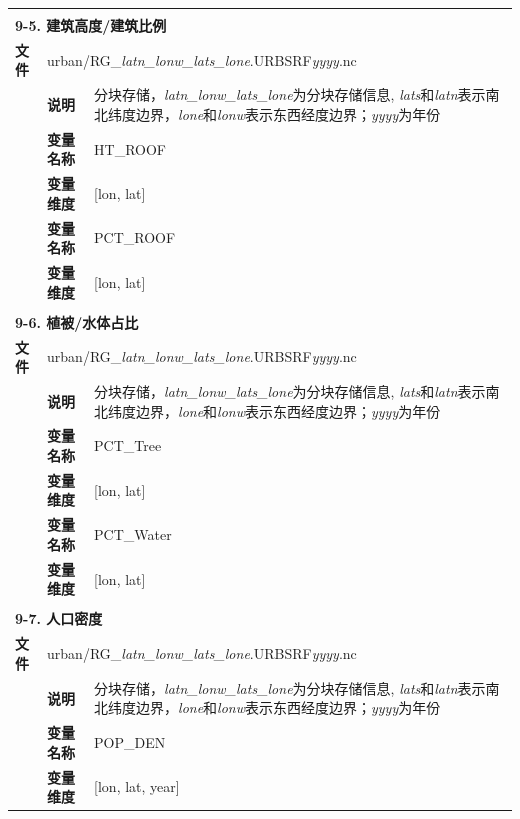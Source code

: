 \documentclass[a4paper,12pt,twoside]{article}
\begin{document}
{\begin{longtable}{llp{}}
\midrule
\vspace{2\baselineskip}\\
\multicolumn{3}{l}{\textbf{9-5. 建筑高度/建筑比例}} \\
\cline{1-3}
\textbf{文件} & \multicolumn{2}{l}{urban/RG\_\textit{latn\_lonw\_lats\_lone}.URBSRF\textit{yyyy}.nc} \\
& \textbf{说明} & 分块存储，\textit{latn\_lonw\_lats\_lone}为分块存储信息, \textit{lats}和\textit{latn}表示南北纬度边界，\textit{lone}和\textit{lonw}表示东西经度边界；\textit{yyyy}为年份 \\
\cline{2-3}
& \textbf{变量名称} & HT\_ROOF \\
& \textbf{变量维度} & {[}lon, lat{]} \\
\cline{2-3}
& \textbf{变量名称} & PCT\_ROOF \\
& \textbf{变量维度} & {[}lon, lat{]} \\

\midrule
\vspace{2\baselineskip}\\
\multicolumn{3}{l}{\textbf{9-6. 植被/水体占比}} \\
\cline{1-3}
\textbf{文件} & \multicolumn{2}{l}{urban/RG\_\textit{latn\_lonw\_lats\_lone}.URBSRF\textit{yyyy}.nc} \\
& \textbf{说明} & 分块存储，\textit{latn\_lonw\_lats\_lone}为分块存储信息, \textit{lats}和\textit{latn}表示南北纬度边界，\textit{lone}和\textit{lonw}表示东西经度边界；\textit{yyyy}为年份 \\
\cline{2-3}
& \textbf{变量名称} & PCT\_Tree \\
& \textbf{变量维度} & {[}lon, lat{]} \\
\cline{2-3}
& \textbf{变量名称} & PCT\_Water \\
& \textbf{变量维度} & {[}lon, lat{]} \\

\midrule
\vspace{2\baselineskip}\\
\multicolumn{3}{l}{\textbf{9-7. 人口密度}} \\
\cline{1-3}
\textbf{文件} & \multicolumn{2}{l}{urban/RG\_\textit{latn\_lonw\_lats\_lone}.URBSRF\textit{yyyy}.nc} \\
& \textbf{说明} & 分块存储，\textit{latn\_lonw\_lats\_lone}为分块存储信息, \textit{lats}和\textit{latn}表示南北纬度边界，\textit{lone}和\textit{lonw}表示东西经度边界；\textit{yyyy}为年份 \\
\cline{2-3}
& \textbf{变量名称} & POP\_DEN \\
& \textbf{变量维度} & {[}lon, lat, year{]} \\


\end{longtable}}
\end{document}
